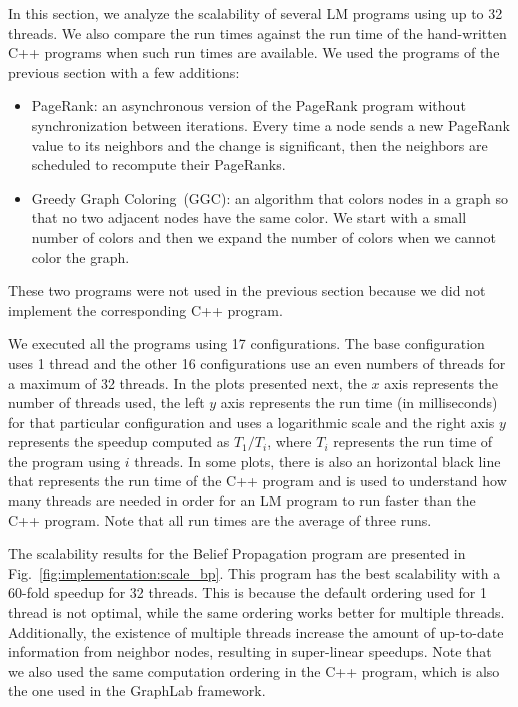 In this section, we analyze the scalability of several LM programs using up to
32 threads. We also compare the run times against the run time of the
hand-written C++ programs when such run times are available. We used the
programs of the previous section with a few additions:

\begin{itemize}

      \item PageRank: an asynchronous version of the PageRank program without
         synchronization between iterations. Every time a node sends a new
         PageRank value to its neighbors and the change is significant, then the
         neighbors are scheduled to recompute their PageRanks.

      \item Greedy Graph Coloring~(GGC): an algorithm that colors nodes in a
         graph so that no two adjacent nodes have the same color. We start with
         a small number of colors and then we expand the number of colors when
         we cannot color the graph.

\end{itemize}

These two programs were not used in the previous section because we did not
implement the corresponding C++ program.

We executed all the programs using 17 configurations. The base configuration
uses 1 thread and the other 16 configurations use an even numbers of threads for
a maximum of 32 threads. In the plots presented next, the $x$ axis represents
the number of threads used, the left $y$ axis represents the run time (in
milliseconds) for that particular configuration and uses a logarithmic scale and
the right axis $y$ represents the speedup computed as $T_1/T_i$, where $T_i$
represents the run time of the program using $i$ threads.  In some plots, there
is also an horizontal black line that represents the run time of the C++ program
and is used to understand how many threads are needed in order for an LM program
to run faster than the C++ program. Note that all run times are the average of
three runs.

The scalability results for the Belief Propagation program are presented in
Fig.~\ref{fig:implementation:scale_bp}. This program has the best scalability
with a 60-fold speedup for 32 threads. This is because the default ordering used
for 1 thread is not optimal, while the same ordering works better for multiple
threads. Additionally, the existence of multiple threads increase the amount of
up-to-date information from neighbor nodes, resulting in super-linear speedups.
Note that we also used the same computation ordering in the C++ program, which
is also the one used in the GraphLab framework.

